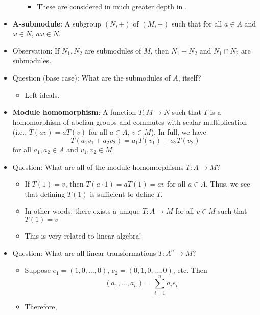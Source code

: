 \documentclass[../notes.tex]{subfiles}
\begin{document}
\begin{itemize}
\begin{enumerate}
        \begin{itemize}
            \item These are considered in much greater depth in \textcite{bib:DummitFoote}.
        \end{itemize}
    \end{enumerate}
    \item \textbf{$\bm{A}$-submodule}: A subgroup $(N,+)$ of $(M,+)$ such that for all $a\in A$ and $\omega\in N$, $a\omega\in N$.
    \item Observation: If $N_1,N_2$ are submodules of $M$, then $N_1+N_2$ and $N_1\cap N_2$ are submodules.
    \item Question (base case): What are the submodules of $A$, itself?
    \begin{itemize}
        \item Left ideals.
    \end{itemize}
    \item \textbf{Module homomorphism}: A function $T:M\to N$ such that $T$ is a homomorphism of abelian groups and commutes with scalar multiplication (i.e., $T(av)=aT(v)$ for all $a\in A$, $v\in M$). In full, we have
    \begin{equation*}
        T(a_1v_1+a_2v_2) = a_1T(v_1)+a_2T(v_2)
    \end{equation*}
    for all $a_1,a_2\in A$ and $v_1,v_2\in M$.
    \item Question: What are all of the module homomorphisms $T:A\to M$?
    \begin{itemize}
        \item If $T(1)=v$, then $T(a\cdot 1)=aT(1)=av$ for all $a\in A$. Thus, we see that defining $T(1)$ is sufficient to define $T$.
        \item In other words, there exists a unique $T:A\to M$ for all $v\in M$ such that $T(1)=v$
        \item This is very related to linear algebra!
    \end{itemize}
    \item Question: What are all linear transformations $T:A^n\to M$?
    \begin{itemize}
        \item Suppose $e_1=(1,0,\dots,0)$, $e_2=(0,1,0,\dots,0)$, etc. Then
        \begin{equation*}
            (a_1,\dots,a_n) = \sum_{i=1}^na_ie_i
        \end{equation*}
        \item Therefore,
        \begin{equation*}

\end{equation*}
\end{itemize}
\end{itemize}
\end{document}

